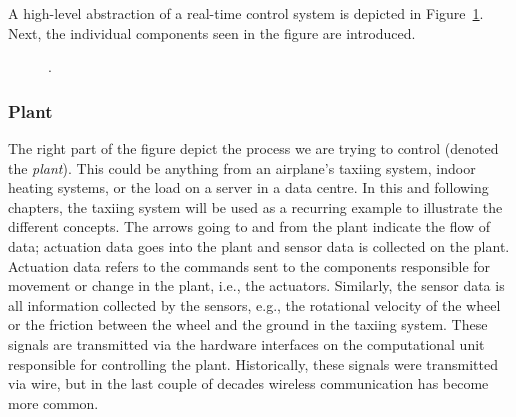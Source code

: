 A high-level abstraction of a real-time control system is depicted in Figure~\ref{fig:high-level-abstraction}.
Next, the individual components seen in the figure are introduced. 
%
\begin{figure}[t]
    \centering
    \caption{.}%
    \label{fig:high-level-abstraction}%
\end{figure}

\subsubsection{Plant}%
%
The right part of the figure depict the process we are trying to control (denoted the \emph{plant}).
This could be anything from an airplane's taxiing system, indoor heating systems, or the load on a server in a data centre.
In this and following chapters, the taxiing system will be used as a recurring example to illustrate the different concepts.
The arrows going to and from the plant indicate the flow of data; actuation data goes into the plant and sensor data is collected on the plant.
Actuation data refers to the commands sent to the components responsible for movement or change in the plant, i.e., the actuators.
Similarly, the sensor data is all information collected by the sensors, e.g., the rotational velocity of the wheel or the friction between the wheel and the ground in the taxiing system.
These signals are transmitted via the hardware interfaces on the computational unit responsible for controlling the plant.
Historically, these signals were transmitted via wire, but in the last couple of decades wireless communication has become more common. 


